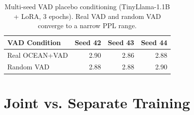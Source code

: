 \documentclass[11pt]{article}
\begin{document}
\begin{table}[tp]
\centering
\caption{Memory requirements per model. Training memory includes gradients and AdamW optimizer states; inference memory is weights only plus KV-cache at batch size 1. ``CPU'' means the model can run without a GPU.}
\label{tab:hardware}
\footnotesize\setlength{\tabcolsep}{2pt}
\end{table}

\begin{table}[tp]
\centering
\caption{Multi-seed VAD placebo conditioning (TinyLlama-1.1B + LoRA, 3 epochs). Real VAD and random VAD converge to a narrow PPL range.}
\label{tab:placebo}
\footnotesize\setlength{\tabcolsep}{3pt}
\begin{tabular}{@{}lrrr@{}}
\toprule
\textbf{VAD Condition} & \textbf{Seed 42} & \textbf{Seed 43} & \textbf{Seed 44} \\
\midrule
Real OCEAN+VAD   & 2.90 & 2.86 & 2.88 \\
Random VAD       & 2.88 & 2.88 & 2.90 \\
\bottomrule
\end{tabular}
\end{table}

\section{Joint vs. Separate Training}
\label{app:joint}
\end{document}
